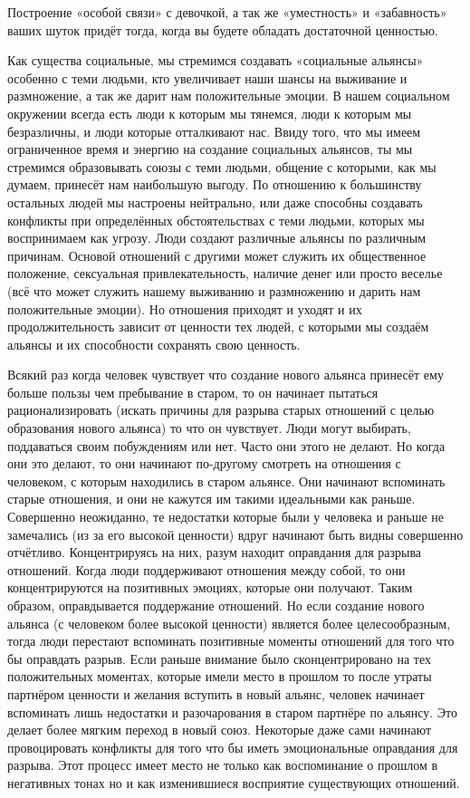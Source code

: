 Построение «особой связи» с девочкой, а так же «уместность» и «забавность» ваших шуток придёт тогда, когда вы будете обладать достаточной ценностью.

Как существа социальные, мы стремимся создавать «социальные альянсы» особенно с теми людьми, кто увеличивает наши шансы на выживание и размножение, а так же дарит нам положительные эмоции. В нашем социальном окружении всегда есть люди к которым мы тянемся, люди к которым мы безразличны, и люди которые отталкивают нас. Ввиду того, что мы имеем ограниченное время и энергию на создание социальных альянсов, ты мы стремимся образовывать союзы с теми людьми, общение с которыми, как мы думаем, принесёт нам наибольшую выгоду. По отношению к большинству остальных людей мы настроены нейтрально, или даже способны создавать конфликты при определённых обстоятельствах с теми людьми, которых мы воспринимаем как угрозу. Люди создают различные альянсы по различным причинам. Основой отношений с другими может служить их общественное положение, сексуальная привлекательность, наличие денег или просто веселье (всё что может служить нашему выживанию и размножению и дарить нам положительные эмоции). Но отношения приходят и уходят и их продолжительность зависит от ценности тех людей, с которыми мы создаём альянсы и их способности сохранять свою ценность.

\RULE  Всякий раз когда человек чувствует что создание нового альянса принесёт ему больше пользы чем пребывание в старом, то он начинает пытаться рационализировать (искать причины для разрыва старых отношений с целью образования нового альянса) то что он чувствует. Люди могут выбирать, поддаваться своим побуждениям или нет. Часто они этого не делают. Но когда они это делают, то они начинают по-другому смотреть на отношения с человеком, с которым находились в старом альянсе. Они начинают вспоминать старые отношения, и они не кажутся им такими идеальными как раньше. Совершенно неожиданно, те недостатки которые были у человека и раньше не замечались (из за его высокой ценности) вдруг начинают быть видны совершенно отчётливо. Концентрируясь на них, разум находит оправдания для разрыва отношений. Когда люди поддерживают отношения между собой, то они концентрируются на позитивных эмоциях, которые они получают. Таким образом, оправдывается поддержание отношений. Но если создание нового альянса (с человеком более высокой ценности) является более целесообразным, тогда люди перестают вспоминать позитивные моменты отношений для того что бы оправдать разрыв. Если раньше внимание было сконцентрировано на тех положительных моментах, которые имели место в прошлом то после утраты партнёром ценности и желания вступить в новый альянс, человек начинает вспоминать лишь недостатки и разочарования в старом партнёре по альянсу. Это делает более мягким переход в новый союз. Некоторые даже сами начинают провоцировать конфликты для того что бы иметь эмоциональные оправдания для разрыва. Этот процесс имеет место не только как воспоминание о прошлом в негативных тонах но и как изменившиеся восприятие существующих отношений.

